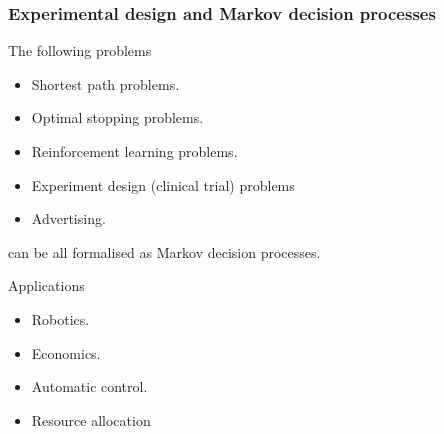 \documentclass[9pt]{beamer}
\begin{document}
{
  \begin{frame}\frametitle{Experimental design and Markov decision processes}
    The following problems
    \begin{itemize}
    \item Shortest path problems.
    \item Optimal stopping problems.
    \item Reinforcement learning problems.
    \item Experiment design (clinical trial) problems
    \item Advertising. 
    \end{itemize}
    can be all formalised as \alert{Markov decision processes}.

    \begin{block}{Applications}
      \begin{itemize}
      \item Robotics.
      \item Economics.
      \item Automatic control.
      \item Resource allocation
      \end{itemize}
    \end{block}
  \end{frame}
}
\end{document}
